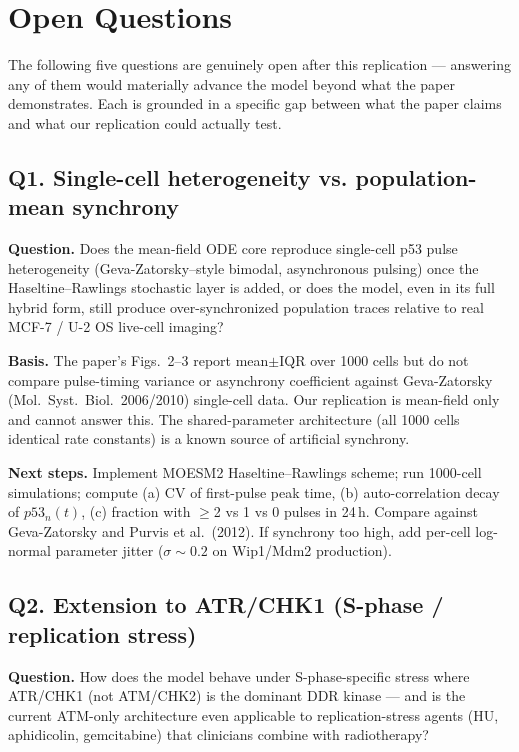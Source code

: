 \section{Open Questions}
\label{sec:openq}

The following five questions are genuinely open after this replication ---
answering any of them would materially advance the model beyond what the paper
demonstrates. Each is grounded in a specific gap between what the paper claims
and what our replication could actually test.

\subsection*{Q1. Single-cell heterogeneity vs. population-mean synchrony}
\textbf{Question.} Does the mean-field ODE core reproduce single-cell p53
pulse heterogeneity (Geva-Zatorsky--style bimodal, asynchronous pulsing) once
the Haseltine--Rawlings stochastic layer is added, or does the model, even in
its full hybrid form, still produce over-synchronized population traces
relative to real MCF-7 / U-2 OS live-cell imaging?

\textbf{Basis.} The paper's Figs.~2--3 report mean$\pm$IQR over 1000 cells but
do not compare pulse-timing variance or asynchrony coefficient against
Geva-Zatorsky (Mol.\ Syst.\ Biol.\ 2006/2010) single-cell data. Our
replication is mean-field only and cannot answer this. The shared-parameter
architecture (all 1000 cells identical rate constants) is a known source of
artificial synchrony.

\textbf{Next steps.} Implement MOESM2 Haseltine--Rawlings scheme; run 1000-cell
simulations; compute (a) CV of first-pulse peak time, (b) auto-correlation
decay of $p53_n(t)$, (c) fraction with $\geq$2 vs 1 vs 0 pulses in 24\,h.
Compare against Geva-Zatorsky and Purvis et al.\ (2012). If synchrony too high,
add per-cell log-normal parameter jitter ($\sigma \sim 0.2$ on Wip1/Mdm2
production).

\subsection*{Q2. Extension to ATR/CHK1 (S-phase / replication stress)}
\textbf{Question.} How does the model behave under S-phase-specific stress
where ATR/CHK1 (not ATM/CHK2) is the dominant DDR kinase --- and is the current
ATM-only architecture even applicable to replication-stress agents (HU,
aphidicolin, gemcitabine) that clinicians combine with radiotherapy?

